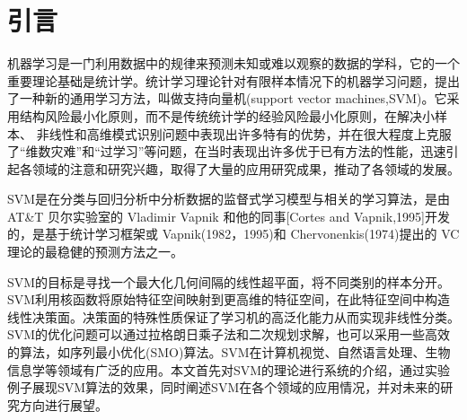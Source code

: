 

\chapter{\hei \textbf{引言}}

机器学习是一门利用数据中的规律来预测未知或难以观察的数据的学科，它的一个重要理论基础是统计学。统计学习理论\cite{张学工2000关于统计学习理论与支持向量机}针对有限样本情况下的机器学习问题，提出了一种新的通用学习方法，叫做支持向量机(support vector machines,SVM)。它采用结构风险最小化原则，而不是传统统计学的经验风险最小化原则\cite{cortes1995support,祁亨年2004支持向量机及其应用研究综述}，在解决小样本、 非线性和高维模式识别问题中表现出许多特有的优势，并在很大程度上克服了“维数灾难”和“过学习”等问题，在当时表现出许多优于已有方法的性能，迅速引起各领域的注意和研究兴趣，取得了大量的应用研究成果，推动了各领域的发展。

SVM是在分类与回归分析中分析数据的监督式学习模型与相关的学习算法，是由 AT\&T 贝尔实验室的 Vladimir Vapnik 和他的同事[Cortes and Vapnik,1995\cite{cortes1995support}]开发的，是基于统计学习框架或 Vapnik(1982，1995)和 Chervonenkis(1974)提出的 VC 理论\cite{blumer1989learnability}的最稳健的预测方法之一。

SVM的目标是寻找一个最大化几何间隔的线性超平面，将不同类别的样本分开。SVM利用核函数将原始特征空间映射到更高维的特征空间，在此特征空间中构造线性决策面。决策面的特殊性质保证了学习机的高泛化能力从而实现非线性分类\cite{cortes1995support}。SVM的优化问题可以通过拉格朗日乘子法和二次规划求解，也可以采用一些高效的算法，如序列最小优化(SMO)算法。SVM在计算机视觉、自然语言处理、生物信息学等领域\cite{顾亚祥2011支持向量机研究进展}有广泛的应用\cite{张松兰2016支持向量机的算法及应用综述}。本文首先对SVM的理论进行系统的介绍，通过实验例子展现SVM算法的效果，同时阐述SVM在各个领域的应用情况，并对未来的研究方向进行展望。





